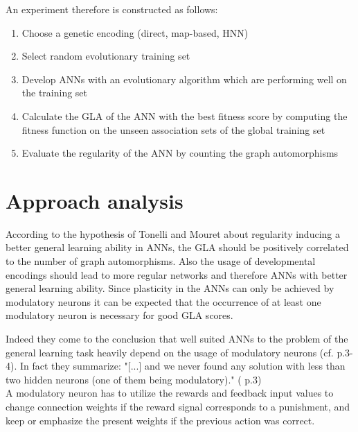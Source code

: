 \documentclass[12pt,twoside]{article}
\theoremstyle{plain}
\theoremstyle{definition}
\theoremstyle{remark}
\begin{document}
An experiment therefore is constructed as follows:
\begin{enumerate}
	\item Choose a genetic encoding (direct, map-based, HNN)
	\item Select random evolutionary training set
	\item Develop ANNs with an evolutionary algorithm which are performing well on the training set
	\item Calculate the GLA of the ANN with the best fitness score by computing the fitness function on the unseen association sets of the global training set
	\item Evaluate the regularity of the ANN by counting the graph automorphisms
\end{enumerate}

\section{Approach analysis}
\label{sec:analysis}
According to the hypothesis of Tonelli and Mouret about regularity inducing a better general learning ability in ANNs, the GLA should be positively correlated to the number of graph automorphisms. 
Also the usage of developmental encodings should lead to more regular networks and therefore ANNs with better general learning ability.
Since plasticity in the ANNs can only be achieved by modulatory neurons it can be expected that the occurrence of at least one modulatory neuron is necessary for good GLA scores.\medskip

Indeed they come to the conclusion that well suited ANNs to the problem of the general learning task heavily depend on the usage of modulatory neurons (cf. \cite{citeulike:12788284} p.3-4). In fact they summarize: "[...] and we never found any solution with less than two hidden neurons (one of them being modulatory)." (\cite{citeulike:12788284} p.3)\\
A modulatory neuron has to utilize the rewards and feedback input values to change connection weights if the reward signal corresponds to a punishment, and keep or emphasize the present weights if the previous action was correct.\medskip
\end{document}
